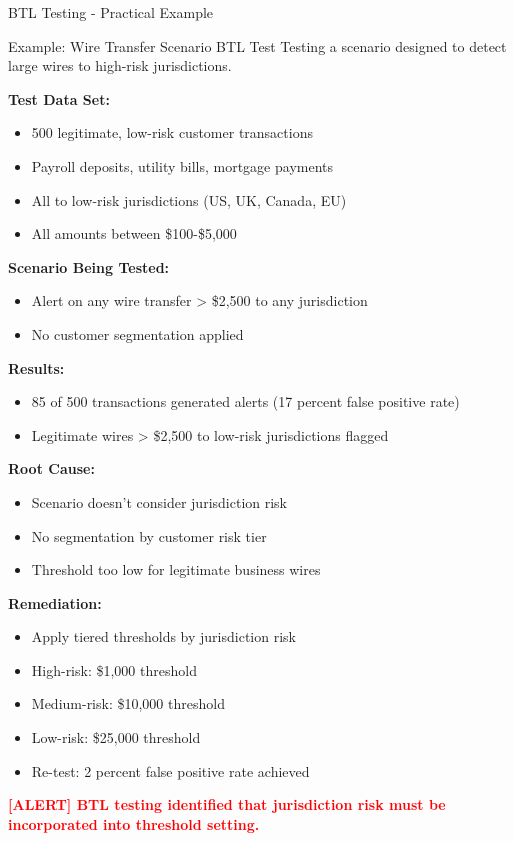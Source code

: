 \documentclass[11pt,a4paper]{beamer}
\newcommand{\redflag}[1]{\textcolor{red}{\textbf{[ALERT] #1}}}
\begin{document}
\begin{frame}{BTL Testing - Practical Example}
	\begin{block}{Example: Wire Transfer Scenario BTL Test}
		Testing a scenario designed to detect large wires to high-risk jurisdictions.
	\end{block}
	
	\textbf{Test Data Set:}
	\begin{itemize}
		\item 500 legitimate, low-risk customer transactions
		\item Payroll deposits, utility bills, mortgage payments
		\item All to low-risk jurisdictions (US, UK, Canada, EU)
		\item All amounts between \$100-\$5,000
	\end{itemize}
	
	\textbf{Scenario Being Tested:}
	\begin{itemize}
		\item Alert on any wire transfer > \$2,500 to any jurisdiction
		\item No customer segmentation applied
	\end{itemize}
	
	\textbf{Results:}
	\begin{itemize}
		\item 85 of 500 transactions generated alerts (17 percent false positive rate)
		\item Legitimate wires > \$2,500 to low-risk jurisdictions flagged
	\end{itemize}
	
	\textbf{Root Cause:}
	\begin{itemize}
		\item Scenario doesn't consider jurisdiction risk
		\item No segmentation by customer risk tier
		\item Threshold too low for legitimate business wires
	\end{itemize}
	
	\textbf{Remediation:}
	\begin{itemize}
		\item Apply tiered thresholds by jurisdiction risk
		\item High-risk: \$1,000 threshold
		\item Medium-risk: \$10,000 threshold
		\item Low-risk: \$25,000 threshold
		\item Re-test: 2 percent false positive rate achieved
	\end{itemize}
	
	\redflag{BTL testing identified that jurisdiction risk must be incorporated into threshold setting.}
\end{frame}
\end{document}
